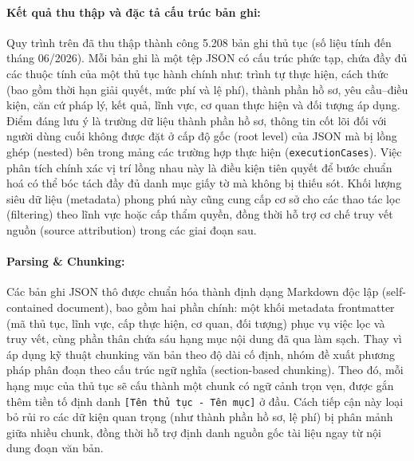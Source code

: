 \documentclass[11pt]{article}
\begin{document}
\paragraph{Kết quả thu thập và đặc tả cấu trúc bản ghi: }
Quy trình trên đã thu thập thành công 5.208 bản ghi thủ tục (số liệu tính đến tháng 06/2026). Mỗi bản ghi là một tệp JSON có cấu trúc phức tạp, chứa đầy đủ các thuộc tính của một thủ tục hành chính như: trình tự thực hiện, cách thức (bao gồm thời hạn giải quyết, mức phí và lệ phí), thành phần hồ sơ, yêu cầu--điều kiện, căn cứ pháp lý, kết quả, lĩnh vực, cơ quan thực hiện và đối tượng áp dụng. Điểm đáng lưu ý là trường dữ liệu thành phần hồ sơ, thông tin cốt lõi đối với người dùng cuối  không được đặt ở cấp độ gốc (root level) của JSON mà bị lồng ghép (nested) bên trong mảng các trường hợp thực hiện (\texttt{executionCases}). Việc phân tích chính xác vị trí lồng nhau này là điều kiện tiên quyết để bước chuẩn hoá có thể bóc tách đầy đủ danh mục giấy tờ mà không bị thiếu sót. Khối lượng siêu dữ liệu (metadata) phong phú này cũng cung cấp cơ sở cho các thao tác lọc (filtering) theo lĩnh vực hoặc cấp thẩm quyền, đồng thời hỗ trợ cơ chế truy vết nguồn (source attribution) trong các giai đoạn sau.

\paragraph{Parsing \& Chunking: }
Các bản ghi JSON thô được chuẩn hóa thành định dạng Markdown độc lập (self-contained document), bao gồm hai phần chính: một khối metadata frontmatter (mã thủ tục, lĩnh vực, cấp thực hiện, cơ quan, đối tượng) phục vụ việc lọc và truy vết, cùng phần thân chứa sáu hạng mục nội dung đã qua làm sạch. Thay vì áp dụng kỹ thuật chunking văn bản theo độ dài cố định, nhóm đề xuất phương pháp phân đoạn theo cấu trúc ngữ nghĩa (section-based chunking). Theo đó, mỗi hạng mục của thủ tục sẽ cấu thành một chunk có ngữ cảnh trọn vẹn, được gắn thêm tiền tố định danh \texttt{[Tên thủ tục - Tên mục]} ở đầu. Cách tiếp cận này loại bỏ rủi ro các dữ kiện quan trọng (như thành phần hồ sơ, lệ phí) bị phân mảnh giữa nhiều chunk, đồng thời hỗ trợ định danh nguồn gốc tài liệu ngay từ nội dung đoạn văn bản.
\end{document}
